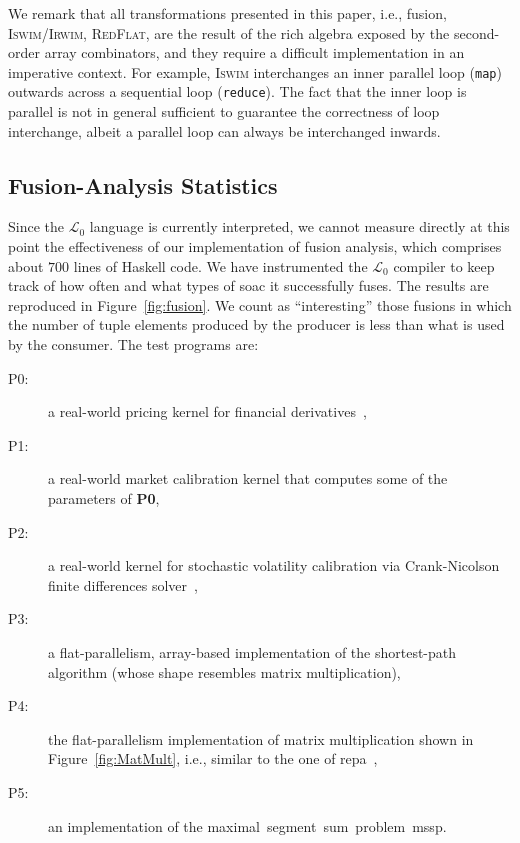 \documentclass{sigplanconf}  %
\newcommand{\LO}{$\mathcal{L}_0$}
\begin{document}
We remark that all transformations presented in this paper, i.e., fusion, 
\textsc{Iswim}/\textsc{Irwim}, \textsc{RedFlat}, are the result of the
rich algebra exposed by the second-order array combinators, and they require
a difficult implementation in an imperative context.   For example, 
\textsc{Iswim} interchanges an inner parallel loop ({\tt map}) outwards across
a sequential loop ({\tt reduce}). The fact that the inner loop is parallel
is not in general sufficient to guarantee the correctness of loop interchange, 
albeit a parallel loop can always be interchanged inwards.  

\subsection{Fusion-Analysis Statistics}
\label{sec:results}

Since the \LO{} language is currently interpreted, we cannot measure directly
at this point the effectiveness of our implementation of fusion analysis, 
which comprises about $700$ lines of Haskell code. 
%
We have instrumented the \LO{} compiler to keep track of how often 
and what types of {\sc soac} it successfully fuses.
The results are reproduced in Figure~\ref{fig:fusion}.  
We count as ``interesting'' those fusions in which the number of tuple
elements produced by the producer is less than what is used by the
consumer.  The test programs are:

\begin{description}
\item[P0:] a real-world pricing kernel for financial 
                derivatives~\cite{LexiFiPricing}, %
\item[P1:] a real-world market calibration kernel that 
                computes some of the parameters of \textbf{P0},%
\item[P2:] a real-world kernel for stochastic volatility calibration via 
                Crank-Nicolson finite differences solver~\cite{munkIntro}, %
\item[P3:] a flat-parallelism, array-based implementation of 
                the shortest-path algorithm (whose shape resembles matrix multiplication),
\item[P4:] the flat-parallelism implementation of matrix multiplication shown 
            in Figure~\ref{fig:MatMult}, i.e., similar to the one 
            of {\sc repa}~\cite{keller2010regular}, %
\item[P5:] an implementation of the maximal~segment~sum~problem~{\sc mssp}. %
\end{description}
\end{document}
